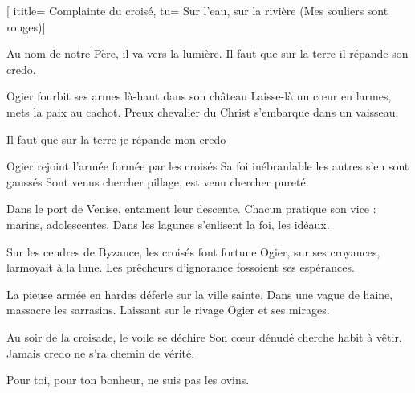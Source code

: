 [
ititle= {Complainte du croisé},
tu= {Sur l'eau, sur la rivière (Mes souliers sont rouges)}]


\beginchorus
Au nom de notre Père, il va vers la lumière.
Il faut que sur la terre il répande son credo.
\endchorus

\beginverse
Ogier fourbit ses armes là-haut dans son château
Laisse-là un cœur en larmes, mets la paix au cachot.
Preux chevalier du Christ s'embarque dans un vaisseau.
\endverse

\beginchorus
{} {Il faut que sur la terre je répande mon credo }
\endchorus

\beginverse
Ogier rejoint l'armée formée par les croisés
Sa foi inébranlable les autres s'en sont gaussés
Sont venus chercher pillage, est venu chercher pureté.
\endverse

\beginverse
Dans le port de Venise, entament leur descente.
Chacun pratique son vice : marins, adolescentes.
Dans les lagunes s'enlisent la foi, les idéaux.
\endverse

\beginverse
Sur les cendres de Byzance, les croisés font fortune
Ogier, sur ses croyances, larmoyait à la lune.
Les prêcheurs d'ignorance fossoient ses espérances.
\endverse

\beginverse
La pieuse armée en hardes déferle sur la ville sainte,
Dans une vague de haine, massacre les sarrasins.
Laissant sur le rivage Ogier et ses mirages.
\endverse

\beginverse
Au soir de la croisade, le voile se déchire
Son cœur dénudé cherche habit à vêtir.
Jamais credo ne s'ra chemin de vérité.
\endverse

\beginchorus
{} {Pour toi, pour ton bonheur, ne suis pas les ovins. }
\endchorus
\endsong